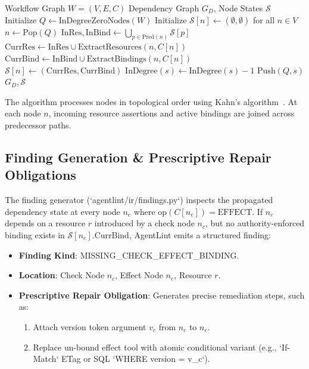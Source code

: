 \begin{algorithm}[h]
\caption{AgentLint Topological Dependency Propagation}
\label{alg:dependency_propagation}
\begin{algorithmic}[1]
\REQUIRE Workflow Graph $W = (V, E, C)$
\ENSURE Dependency Graph $G_D$, Node States $\mathcal{S}$
\STATE Initialize $Q \gets \text{InDegreeZeroNodes}(W)$
\STATE Initialize $\mathcal{S}[n] \gets (\emptyset, \emptyset)$ for all $n \in V$
    \STATE $n \gets \text{Pop}(Q)$
    \STATE $\text{InRes}, \text{InBind} \gets \bigcup_{p \in \text{Pred}(n)} \mathcal{S}[p]$
    \STATE $\text{CurrRes} \gets \text{InRes} \cup \text{ExtractResources}(n, C[n])$
    \STATE $\text{CurrBind} \gets \text{InBind} \cup \text{ExtractBindings}(n, C[n])$
    \STATE $\mathcal{S}[n] \gets (\text{CurrRes}, \text{CurrBind})$
        \STATE $\text{InDegree}(s) \gets \text{InDegree}(s) - 1$
            \STATE $\text{Push}(Q, s)$
        \ENDIF
    \ENDFOR
\ENDWHILE
\RETURN $G_D, \mathcal{S}$
\end{algorithmic}
\end{algorithm}

The algorithm processes nodes in topological order using Kahn's algorithm~\cite{kahn1962topological}. At each node $n$, incoming resource assertions and active bindings are joined across predecessor paths.

\subsection{Finding Generation \& Prescriptive Repair Obligations}
The finding generator (`agentlint/ir/findings.py`) inspects the propagated dependency state at every node $n_e$ where $\text{op}(C[n_e]) = \text{EFFECT}$. If $n_e$ depends on a resource $r$ introduced by a check node $n_c$, but no authority-enforced binding exists in $\mathcal{S}[n_e].\text{CurrBind}$, AgentLint emits a structured finding:
\begin{itemize}
    \item \textbf{Finding Kind}: \textsf{MISSING\_CHECK\_EFFECT\_BINDING}.
    \item \textbf{Location}: Check Node $n_c$, Effect Node $n_e$, Resource $r$.
    \item \textbf{Prescriptive Repair Obligation}: Generates precise remediation steps, such as:
      \begin{enumerate}
          \item Attach version token argument $v_c$ from $n_c$ to $n_e$.
          \item Replace un-bound effect tool with atomic conditional variant (e.g., `If-Match` ETag or SQL `WHERE version = v_c`).
      \end{enumerate}
\end{itemize}


